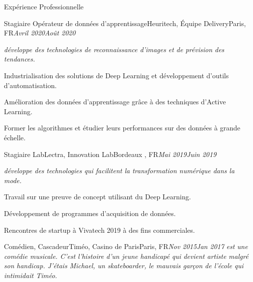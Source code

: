 \documentclass{resume}
\begin{document}
	\begin{rSection}{Expérience Professionnelle}
		\begin{job}{Stagiaire Opérateur de données d'apprentissage}{Heuritech, Équipe Delivery}{Paris, FR}{\em Avril 2020}{\em Août 2020}{
			\textit{\small{développe des technologies de reconnaissance d'images et de prévision des tendances.}}
			\begin{itemize}
			\small{
  				\item Industrialisation des solutions de Deep Learning et développement d'outils d'automatisation.
				\item Amélioration des données d'apprentissage grâce à des techniques d'Active Learning.
				\item Former les algorithmes et étudier leurs performances sur des données à grande échelle.
				}
			\end{itemize}
		}
		\end{job}
		\begin{job}{Stagiaire Lab}{Lectra, Innovation Lab}{Bordeaux , FR}{\em Mai 2019}{\em Juin 2019}{
			\textit{\small{développe des technologies qui facilitent la transformation numérique dans la mode.}}
			\begin{itemize}
			\small{
				  	\item Travail sur une preuve de concept utilisant du Deep Learning.
					\item Développement de programmes d’acquisition de données.
					\item Rencontres de startup à Vivatech 2019 à des fins commerciales.				
			}
			\end{itemize}
		}
		\end{job}

		\begin{job}{Comédien, Cascadeur}{Timéo, Casino de Paris}{Paris, FR}{\em Nov 2015}{\em Jan 2017}{
			\textit{\small{ est une comédie musicale. C'est l'histoire d'un jeune handicapé qui devient artiste malgré son handicap. J'étais Michael, un skateboarder, le mauvais garçon de l'école qui intimidait Timéo.}}
		}
		\end{job}
	\end{rSection}
	
\end{document}
